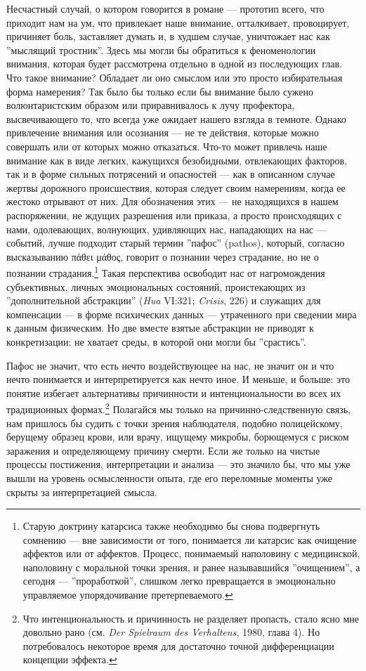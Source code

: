 \documentclass[12pt]{book}
\begin{document}
Несчастный случай, о котором говорится в романе --- прототип всего, что приходит нам на ум, что привлекает наше внимание, отталкивает, провоцирует, причиняет боль, заставляет думать и, в худшем случае, уничтожает нас как ''мыслящий тростник''. Здесь мы могли бы обратиться к феноменологии внимания, которая будет рассмотрена отдельно в одной из последующих глав. Что такое внимание? Обладает ли оно смыслом или это просто избирательная форма намерения? Так было бы только если бы внимание было сужено волюнтаристским образом или приравнивалось к лучу профектора, высвечивающего то, что всегда уже ожидает нашего взгляда в темноте. Однако привлечение внимания или осознания --- не те действия, которые можно совершать или от которых можно отказаться. Что-то может привлечь наше внимание как в виде легких, кажущихся безобидными, отвлекающих факторов, так и в форме сильных потрясений и опасностей --- как в описанном случае жертвы дорожного происшествия, которая следует своим намерениям, когда ее жестоко отрывают от них. Для обозначения этих --- не находящихся в нашем распоряжении, не ждущих разрешения или приказа, а просто происходящих с нами, одолевающих, волнующих, удивляющих нас, нападающих на нас --- событий, лучше подходит старый термин ''пафос'' (pathos), который, согласно высказыванию πάθει μάθος, говорит о познании через страдание, но не о познании страдания.\footnote{Старую доктрину катарсиса также необходимо бы снова подвергнуть сомнению --- вне зависимости от того, понимается ли катарсис как очищение аффектов или от аффектов. Процесс, понимаемый наполовину с медицинской, наполовину с моральной точки зрения, и ранее называвшийся ''очищением'', а сегодня --- ''проработкой'', слишком легко превращается в эмоционально управляемое упорядочивание претерпеваемого.} Такая перспектива освободит нас от нагромождения субъективных, личных эмоциональных состояний, проистекающих из ''дополнительной абстракции'' (\textit{Hua} VI:321; \textit{Crisis}, 226) и служащих для компенсации --- в форме психических данных --- утраченного при сведении мира к данным физическим. Но две вместе взятые абстракции не приводят к конкретизации: не хватает среды, в которой они могли бы ''срастись''.

Пафос не значит, что есть нечто воздействующее на нас, не значит он и что нечто понимается и интерпретируется как нечто иное. И меньше, и больше: это понятие избегает альтернативы причинности и интенциональности во всех их традиционных формах.\footnote{Что интенциональность и причинность не разделяет пропасть, стало ясно мне довольно рано (см. \textit{Der Spielraum des Verhaltens}, 1980, глава 4). Но потребовалось некоторое время для достаточно точной дифференциации концепции эффекта.} Полагайся мы только на причинно-следственную связь, нам пришлось бы судить с точки зрения наблюдателя, подобно полицейскому, берущему образец крови, или врачу, ищущему микробы, борющемуся с риском заражения и определяющему причину смерти. Если же только на чистые процессы постижения, интерпретации и анализа --- это значило бы, что мы уже вышли на уровень осмысленности опыта, где его переломные моменты уже скрыты за интерпретацией смысла.
\end{document}
